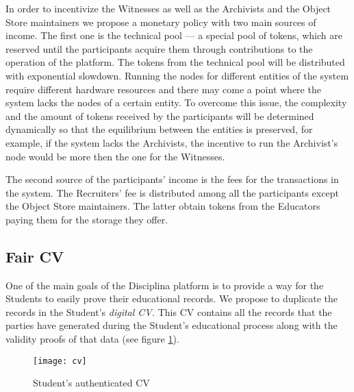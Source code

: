 In order to incentivize the Witnesses as well as the Archivists and the Object Store maintainers we propose a monetary policy with two main sources of income. The first one is the technical pool — a special pool of tokens, which are reserved until the participants acquire them through contributions to the operation of the platform. The tokens from the technical pool will be distributed with exponential slowdown. Running the nodes for different entities of the system require different hardware resources and there may come a point where the system lacks the nodes of a certain entity. To overcome this issue, the complexity and the amount of tokens received by the participants will be determined dynamically so that the equilibrium between the entities is preserved, for example, if the system lacks the Archivists, the incentive to run the Archivist's node would be more then the one for the Witnesses.

The second source of the participants' income is the fees for the transactions in the system. The Recruiters' fee is distributed among all the participants except the Object Store maintainers. The latter obtain tokens from the Educators paying them for the storage they offer.

\subsection{Fair CV}
One of the main goals of the Disciplina platform is to provide a way for the Students to easily prove their educational records. We propose to duplicate the records in the Student's \textit{digital CV.} This CV contains all the records that the parties have generated during the Student's educational process along with the validity proofs of that data (see figure \ref{fig:cv}).

\begin{figure}[ht]
\centering
\texttt{[image: cv]}
\caption{Student's authenticated CV}
\label{fig:cv}
\end{figure}


